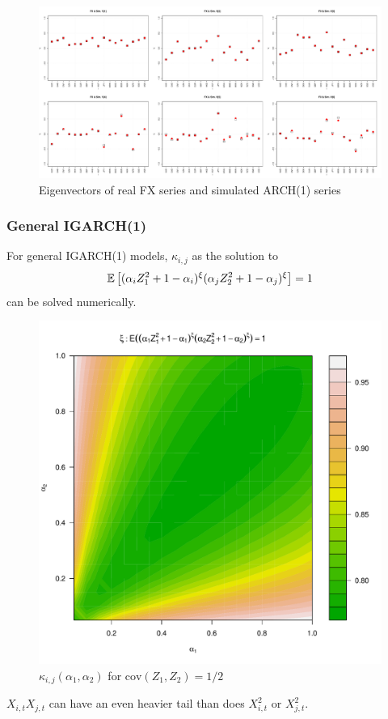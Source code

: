 \documentclass{beamer}
\begin{document}
\begin{frame}
  \begin{figure}[htb!]
    \centering
    \includegraphics[scale=0.2]{FX_ARCH_eigenvectors.pdf}
    \caption{\tiny Eigenvectors of real FX series and simulated ARCH(1) series}
  \end{figure}
\end{frame}

\begin{frame}
  \frametitle{General IGARCH(1)}
  For general IGARCH(1) models, $\kappa_{i,j}$ as the solution to
  \begin{equation*}
    \mathbb{E} \left[
      (
      \alpha_i Z_1^2 + 1 - \alpha_i
      )^\xi
      (
      \alpha_j Z_2^2 + 1 - \alpha_j
      )^\xi\right] = 1
  \end{equation*}
  can be solved numerically.
  \begin{figure}
    \begin{center}
      \includegraphics[scale=0.2]{igarch_rho0dot5.pdf}      
    \end{center}
    \label{fig:xi_rho0.5}
    \caption{$\kappa_{i,j}(\alpha_1, \alpha_2)$ for $\text{cov}(Z_1, Z_2) = 1/2$}
  \end{figure}
  $X_{i,t} X_{j,t}$ can have an even heavier tail than does $X_{i,t}^2$ or $X_{j,t}^2$.
\end{frame}
\end{document}
